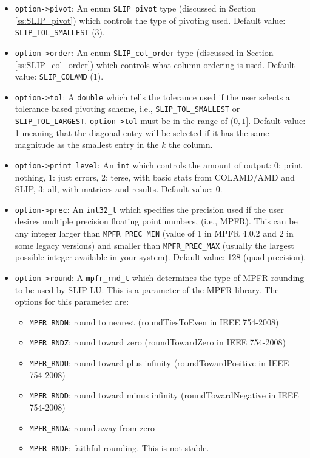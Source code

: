 \documentclass[12pt]{article}
\theoremstyle{definition}
\begin{document}
\begin{itemize}
\item
\verb|option->pivot|: An enum \verb|SLIP_pivot| type (discussed in Section
\ref{ss:SLIP_pivot}) which controls the type of pivoting used. Default value:
\verb|SLIP_TOL_SMALLEST| (3).

\item
\verb|option->order|: An enum \verb|SLIP_col_order| type (discussed in Section
\ref{ss:SLIP_col_order}) which controls what column ordering is used. Default
value: \verb|SLIP_COLAMD| (1).

\item
\verb|option->tol|: A \verb|double| which tells the tolerance used if the user
selects a tolerance based pivoting scheme, i.e., \verb|SLIP_TOL_SMALLEST| or
\verb|SLIP_TOL_LARGEST|. \verb|option->tol| must be in the range of $(0,1]$.
Default value: 1 meaning that the diagonal entry will be selected if it has the
same magnitude as the smallest entry in the $k$ the column.

\item
\verb|option->print_level|: An \verb|int| which controls the amount of
output:
0: print nothing, 1: just errors, 2: terse, with basic stats from
COLAMD/AMD and SLIP, 3: all, with matrices and results. Default value: 0.

\item
\verb|option->prec|: An \verb|int32_t| which specifies the precision used if
the user desires multiple precision floating point numbers, (i.e., MPFR). This
can be any integer larger than \verb|MPFR_PREC_MIN| (value of 1 in MPFR 4.0.2
and 2 in some legacy versions) and smaller than \verb|MPFR_PREC_MAX| (usually
the largest possible integer available in your system). Default value: 128
(quad precision).

\item
\verb|option->round|: A \verb|mpfr_rnd_t| which determines the type
of MPFR rounding to be used by SLIP LU. This is a parameter of the MPFR
library. The options for this parameter are:

    \begin{itemize}
        \item \verb|MPFR_RNDN|: round to nearest
            (roundTiesToEven in IEEE 754-2008)
        \item \verb|MPFR_RNDZ|: round toward zero
            (roundTowardZero in IEEE 754-2008)
        \item \verb|MPFR_RNDU|: round toward plus infinity
            (roundTowardPositive in IEEE 754-2008)
        \item \verb|MPFR_RNDD|: round toward minus infinity
            (roundTowardNegative in IEEE 754-2008)
        \item \verb|MPFR_RNDA|: round away from zero
        \item \verb|MPFR_RNDF|: faithful rounding. This is not stable.
    \end{itemize}


\end{itemize}
\end{document}
